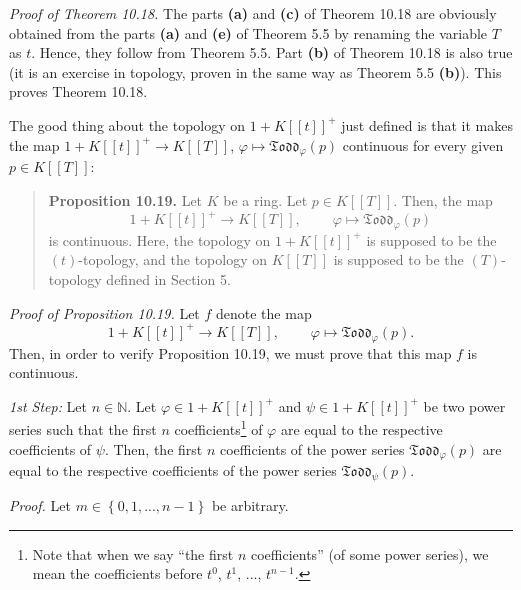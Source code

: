 \documentclass[numbers=enddot,12pt,final,onecolumn,notitlepage]{scrartcl}%
\begin{document}
\textit{Proof of Theorem 10.18.} The parts \textbf{(a)} and \textbf{(c)} of
Theorem 10.18 are obviously obtained from the parts \textbf{(a)} and
\textbf{(e)} of Theorem 5.5 by renaming the variable $T$ as $t$. Hence, they
follow from Theorem 5.5. Part \textbf{(b)} of Theorem 10.18 is also true (it
is an exercise in topology, proven in the same way as Theorem 5.5
\textbf{(b)}). This proves Theorem 10.18.

The good thing about the topology on $1+K\left[  \left[  t\right]  \right]
^{+}$ just defined is that it makes the map $1+K\left[  \left[  t\right]
\right]  ^{+}\rightarrow K\left[  \left[  T\right]  \right]  $, $\varphi
\mapsto\mathfrak{Todd}_{\varphi}\left(  p\right)  $ continuous for every given
$p\in K\left[  \left[  T\right]  \right]  $:

\begin{quote}
\textbf{Proposition 10.19.} Let $K$ be a ring. Let $p\in K\left[  \left[
T\right]  \right]  $. Then, the map%
\[
1+K\left[  \left[  t\right]  \right]  ^{+}\rightarrow K\left[  \left[
T\right]  \right]  ,\ \ \ \ \ \ \ \ \ \ \varphi\mapsto\mathfrak{Todd}%
_{\varphi}\left(  p\right)
\]
is continuous. Here, the topology on $1+K\left[  \left[  t\right]  \right]
^{+}$ is supposed to be the $\left(  t\right)  $-topology, and the topology on
$K\left[  \left[  T\right]  \right]  $ is supposed to be the $\left(
T\right)  $-topology defined in Section 5.
\end{quote}

\textit{Proof of Proposition 10.19.} Let $f$ denote the map
\[
1+K\left[  \left[  t\right]  \right]  ^{+}\rightarrow K\left[  \left[
T\right]  \right]  ,\ \ \ \ \ \ \ \ \ \ \varphi\mapsto\mathfrak{Todd}%
_{\varphi}\left(  p\right)  .
\]
Then, in order to verify Proposition 10.19, we must prove that this map $f$ is continuous.

\textit{1st Step:} Let $n\in\mathbb{N}$. Let $\varphi\in1+K\left[  \left[
t\right]  \right]  ^{+}$ and $\psi\in1+K\left[  \left[  t\right]  \right]
^{+}$ be two power series such that the first $n$ coefficients\footnote{Note
that when we say ``the first $n$ coefficients'' (of some power series), we mean
the coefficients before $t^{0}$, $t^{1}$, $...$, $t^{n-1}$.} of $\varphi$ are
equal to the respective coefficients of $\psi$. Then, the first $n$
coefficients of the power series $\mathfrak{Todd}_{\varphi}\left(  p\right)  $
are equal to the respective coefficients of the power series $\mathfrak{Todd}%
_{\psi}\left(  p\right)  $.

\textit{Proof.} Let $m\in\left\{  0,1,...,n-1\right\}  $ be arbitrary.
\end{document}
